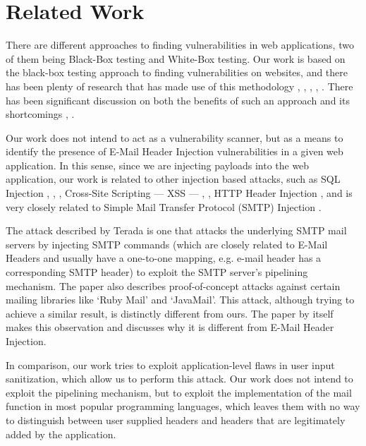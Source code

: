 \chapter{Related Work}

There are different approaches to finding vulnerabilities in web applications, two of them being Black-Box testing and White-Box testing.
Our work is based on the black-box testing approach to finding vulnerabilities on websites, and there has been plenty of research that has made use of this methodology \cite{Beizer:1995:BTT:202699}, \cite{Huang}, \cite{kals2006secubat}, \cite{payet13:ears-in-the-wild}, \cite{zanero2005automatic}. There has been significant discussion on both the benefits of such an approach \cite{black-box} and its shortcomings \cite{Doupe2012}, \cite{Doupe2010}.

Our work does not intend to act as a vulnerability scanner, but as a means to identify the presence of E-Mail Header Injection vulnerabilities in a given web application. In this sense, since we are injecting payloads into the web application, our work is related to other injection based attacks, such as SQL Injection \cite{sql1}, \cite{sql0}, \cite{sql2}, Cross-Site Scripting --- XSS --- \cite{Injection1}, \cite{KleinAmit}, HTTP Header Injection \cite{sessionride}, and is very closely related to Simple Mail Transfer Protocol (SMTP) Injection \cite{Terada2015}.

The attack described by Terada \cite{Terada2015} is one that attacks the underlying SMTP mail servers by injecting SMTP commands (which are closely related to E-Mail Headers and usually have a one-to-one mapping, e.g.  e-mail header has a corresponding  SMTP header) to exploit the SMTP server's pipelining mechanism. The paper also describes proof-of-concept attacks against certain mailing libraries like `Ruby Mail' and `JavaMail'. This attack, although trying to achieve a similar result, is distinctly different from ours. The paper by itself makes this observation and discusses why it is different from E-Mail Header Injection.

In comparison, our work tries to exploit application-level flaws in user input sanitization, which allow us to perform this attack. Our work does not intend to exploit the pipelining mechanism, but to exploit the implementation of the mail function in most popular programming languages, which leaves them with no way to distinguish between user supplied headers and headers that are legitimately added by the application.

